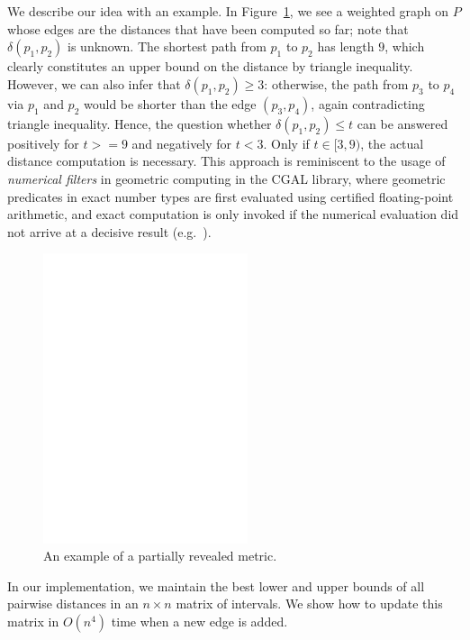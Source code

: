 \documentclass[a4paper,USenglish]{socg-lipics-v2018}
\newcommand{\dist}{\delta}
\newcommand{\complexity}{C_{\dist}}
\begin{document}
We describe our idea with an example. In Figure~\ref{fig:1st_example},
we see a weighted graph on $P$ whose edges are the distances that have
been computed so far; note that $\dist(p_1,p_2)$ is unknown. 
The shortest path from $p_1$ to $p_2$ has length $9$, which clearly
constitutes an upper bound on the distance by triangle inequality.
However, we can also infer that $\dist(p_1,p_2)\geq 3$:
otherwise, the path from $p_3$ to $p_4$ via $p_1$ and $p_2$
would be shorter than the edge $(p_3,p_4)$, again contradicting
triangle inequality.
Hence, the question whether $\dist(p_1,p_2)\leq t$ can be answered positively
for $t>=9$ and negatively for $t<3$. Only if $t\in[3,9)$, the actual
distance computation is necessary. This approach is reminiscent to the usage
of \emph{numerical filters} in geometric computing in the CGAL library,
where geometric predicates in exact number types are first evaluated using 
certified floating-point arithmetic, and exact computation is only
invoked if the numerical evaluation did not arrive at a decisive result
(e.g.~\cite{bbp-interval,kerber-phd}).

\begin{figure}[h]

\centering
\includegraphics[width=6cm]{intro_example.eps}
\caption{An example of a partially revealed metric.}
\label{fig:1st_example}
\end{figure}

In our implementation, we maintain the best lower and upper bounds of all
pairwise distances in an $n\times n$ matrix of intervals. We show how to
update this matrix in $O(n^4)$ time when a new edge is added.
\end{document}
